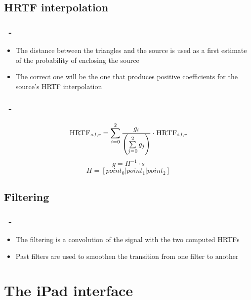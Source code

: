 \documentclass{beamer}
\begin{document}
	\subsection{\textsc{HRTF} interpolation}

	\begin{frame}
		\frametitle{\insertsection\ - \insertsubsection}
		\begin{itemize}
			\item The distance between the triangles and the source is used as a first estimate of the probability of enclosing
				the source
			\item The correct one will be the one that produces positive coefficients for the source's \textsc{HRTF} interpolation
		\end{itemize}
	\end{frame}

	\begin{frame}
		\frametitle{\insertsection\ - \insertsubsection}
		$$ \textsc{HRTF}_{s,l,r} = \sum\limits_{i=0}^2 \dfrac{ g_i } { \left( \sum\limits_{j=0}^2 g_j \right) } \cdot \textsc{HRTF}_{i,l,r} $$
		$$ g = H^{-1} \cdot s $$
		$$ H = [ point_0 | point_1 | point_2 ] $$
	\end{frame}
	
	\subsection{Filtering}

	\begin{frame}
		\frametitle{\insertsection\ - \insertsubsection}
		\begin{itemize}
			\item The filtering is a convolution of the signal with the two computed \textsc{HRTF}s
			\item Past filters are used to smoothen the transition from one filter to another
		\end{itemize}
	\end{frame}

	\section{The iPad interface}
\end{document}
